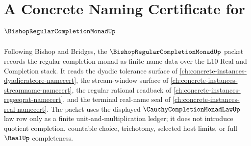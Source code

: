 \chapter{A Concrete Naming Certificate for $\BishopRegularCompletionMonadUp$}
\label{ch:concrete-instances-bishop-regular-completion-monad-namecert}

Following Bishop and Bridges, the $\BishopRegularCompletionMonadUp$ packet records the regular completion monad as finite name data over the L10 Real and Completion stack. It reads the dyadic tolerance surface of \autoref{ch:concrete-instances-dyadicratcore-namecert}, the stream-window surface of \autoref{ch:concrete-instances-streamname-namecert}, the regular rational readback of \autoref{ch:concrete-instances-regseqrat-namecert}, and the terminal real-name seal of \autoref{ch:concrete-instances-real-namecert}. The packet uses the displayed $\CauchyCompletionMonadLawUp$ law row only as a finite unit-and-multiplication ledger; it does not introduce quotient completion, countable choice, trichotomy, selected host limits, or full $\RealUp$ completeness.

